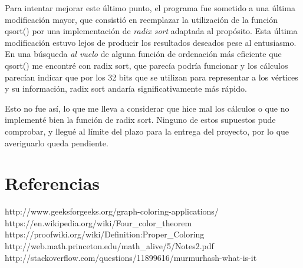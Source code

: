\documentclass[11pt,a4paper]{article}
\theoremstyle{plain}
\begin{document}
Para intentar mejorar este último punto, el programa fue sometido a una última modificación mayor, que consistió en reemplazar la utilización de la función qsort() por una implementación de \emph{radix sort} adaptada al propósito. Esta última modificación estuvo lejos de producir los resultados deseados pese al entusiasmo. En una búsqueda \emph{al vuelo} de alguna función de ordenación más eficiente que qsort() me encontré con radix sort, que parecía podría funcionar y los cálculos parecían indicar que por los 32 bits que se utilizan para representar a los vértices y su información, radix sort andaría significativamente más rápido.

Esto no fue así, lo que me lleva a considerar que hice mal los cálculos o que no implementé bien la función de radix sort. Ninguno de estos supuestos pude comprobar, y llegué al límite del plazo para la entrega del proyecto, por lo que averiguarlo queda pendiente.

\newpage
\section{Referencias}
\begin{thebibliography}{9}
	http://www.geeksforgeeks.org/graph-coloring-applications/
	https://en.wikipedia.org/wiki/Four\_color\_theorem
	https://proofwiki.org/wiki/Definition:Proper\_Coloring
 	http://web.math.princeton.edu/math\_alive/5/Notes2.pdf
 	http://stackoverflow.com/questions/11899616/murmurhash-what-is-it

\end{thebibliography}
\end{document}
